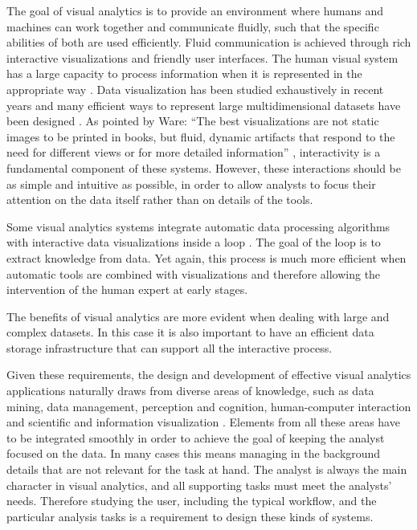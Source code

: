 The goal of visual analytics is to provide an environment where humans and machines can work
together and communicate fluidly, such that the specific abilities of both are used
efficiently. Fluid communication is achieved through rich interactive
visualizations and friendly user interfaces.
The human visual system has a large capacity to process information when it is
represented in the appropriate way \autocite{ware_information_2004}. Data visualization has been studied
exhaustively in recent years and many efficient ways to represent large multidimensional
datasets have been designed \autocite{heer_tour_2010}. As
pointed by Ware: "`The best visualizations are not static images to be printed in books, but fluid,
dynamic artifacts that respond to the need for different views or for more detailed
information"' \autocite{ware_information_2004}, interactivity is a fundamental component of these systems.
However,  these interactions should be
as simple and intuitive as possible, in order to allow analysts to focus their attention on the
data itself \autocite{spence_information_2007} rather than on details of the tools.

Some visual analytics systems integrate automatic data processing algorithms with interactive data visualizations
inside a loop \autocite{keim_mastering_2010}. The goal of the loop is to extract knowledge from data. Yet again, this process
is much more efficient when automatic tools are combined with visualizations and therefore allowing the intervention of the
human expert at early stages.

The benefits of visual analytics are more evident when dealing with large and complex datasets. In this case it is also important
to have an efficient data storage infrastructure that can support all the interactive process.

Given these requirements, the design and development of effective visual analytics
applications naturally draws from diverse areas of knowledge, such as data mining, data management, perception and cognition, human-computer interaction and scientific and information visualization \autocite{keim_visual_2008}. Elements from all these areas have to be integrated smoothly in order to achieve the goal of keeping the analyst focused on the data. In many cases this means managing in the background details that are not relevant for the task at hand. The analyst is always the main character in visual analytics, and all supporting tasks must meet the analysts' needs. Therefore studying the user, including the typical workflow, and the particular analysis tasks is a requirement to design these kinds of systems.


